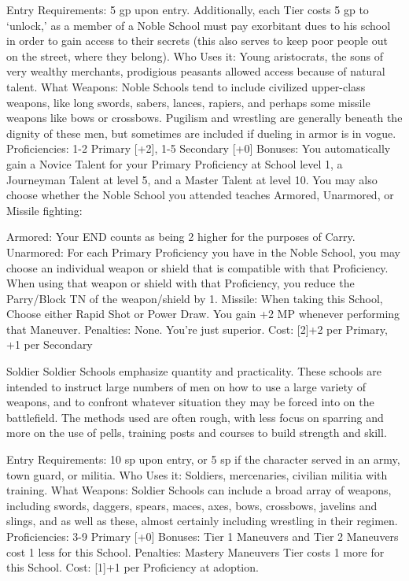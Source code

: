\documentclass[oneside,11pt,english]{book}
\begin{document}
 

Entry Requirements: 5 gp upon entry. Additionally, each Tier costs 5 gp to ‘unlock,’ as a member of a 
Noble School must pay exorbitant dues to his school in order to gain access to their secrets (this also 
serves to keep poor people out on the street, where they belong). 
Who Uses it: Young aristocrats, the sons of very wealthy merchants, prodigious peasants allowed access 
because of natural talent. 
What Weapons: Noble Schools tend to include civilized upper-class weapons, like long swords, sabers, 
lances, rapiers, and perhaps some missile weapons like bows or crossbows. Pugilism and wrestling are 
generally beneath the dignity of these men, but sometimes are included if dueling in armor is in vogue. 
Proficiencies: 1-2 Primary [+2], 1-5 Secondary [+0] 
Bonuses: You automatically gain a Novice Talent for your Primary Proficiency at School level 1, a 
Journeyman Talent at level 5, and a Master Talent at level 10. You may also choose whether the Noble 
School you attended teaches Armored, Unarmored, or Missile fighting: 


Armored: Your END counts as being 2 higher for the purposes of Carry. 
Unarmored: For each Primary Proficiency you have in the Noble School, you may choose an individual 
weapon or shield that is compatible with that Proficiency. When using that weapon or shield with that 
Proficiency, you reduce the Parry/Block TN of the weapon/shield by 1. 
Missile: When taking this School, Choose either Rapid Shot or Power Draw. You gain +2 MP whenever 
performing that Maneuver. 
Penalties: None. You’re just superior. 
Cost: [2]+2 per Primary, +1 per Secondary 

 

Soldier 
Soldier Schools emphasize quantity and practicality. These schools are intended to instruct large numbers 
of men on how to use a large variety of weapons, and to confront whatever situation they may be forced 
into on the battlefield. The methods used are often rough, with less focus on sparring and more on the use 
of pells, training posts and courses to build strength and skill. 

 

Entry Requirements: 10 sp upon entry, or 5 sp if the character served in an army, town guard, or militia. 
Who Uses it: Soldiers, mercenaries, civilian militia with training. 
What Weapons: Soldier Schools can include a broad array of weapons, including swords, daggers, 
spears, maces, axes, bows, crossbows, javelins and slings, and as well as these, almost certainly including 
wrestling in their regimen. 
Proficiencies: 3-9 Primary [+0] 
Bonuses: Tier 1 Maneuvers and Tier 2 Maneuvers cost 1 less for this School. 
Penalties: Mastery Maneuvers Tier costs 1 more for this School. 
Cost: [1]+1 per Proficiency at adoption. 
\end{document}
